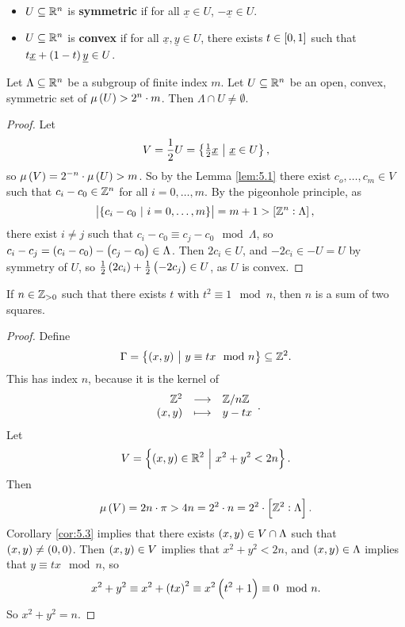 \pagebreak

\begin{definition}
\hfill
\begin{itemize}
\item $ U \subseteq \mathbb{R}^n $ is \textbf{symmetric} if for all $ \underline{x} \in U $, $ -\underline{x} \in U $.
\item $ U \subseteq \mathbb{R}^n $ is \textbf{convex} if for all $ \underline{x}, \underline{y} \in U $, there exists $ t \in \sbr{0, 1} $ such that $ t\underline{x} + \br{1 - t}\underline{y} \in U $.
\end{itemize}
\end{definition}

\begin{corollary}
\label{cor:5.3}
Let $ \Lambda \subseteq \mathbb{R}^n $ be a subgroup of finite index $ m $. Let $ U \subseteq \mathbb{R}^n $ be an open, convex, symmetric set of $ \mu\br{U} > 2^n \cdot m $. Then $ \Lambda \cap U \ne \emptyset $.
\end{corollary}

\begin{proof}
Let
$$ V = \dfrac{1}{2}U = \cbr{\tfrac{1}{2}\underline{x} \st \underline{x} \in U}, $$
so $ \mu\br{V} = 2^{-n} \cdot \mu\br{U} > m $. So by the Lemma \ref{lem:5.1} there exist $ c_o, \dots, c_m \in V $ such that $ c_i - c_0 \in \mathbb{Z}^n $ for all $ i = 0, \dots, m $. By the pigeonhole principle, as
$$ \abs{\cbr{c_i - c_0 \st i = 0, \dots, m}} = m + 1 > \sbr{\ZZ^n : \Lambda}, $$
there exist $ i \ne j $ such that $ c_i - c_0 \equiv c_j - c_0 \mod \Lambda $, so $ c_i - c_j = \br{c_i - c_0} - \br{c_j - c_0} \in \Lambda $. Then $ 2c_i \in U $, and $ -2c_i \in -U = U $ by symmetry of $ U $, so $ \tfrac{1}{2}\br{2c_i} + \tfrac{1}{2}\br{-2c_j} \in U $, as $ U $ is convex.
\end{proof}

\begin{theorem}
If $ n \in \mathbb{Z}_{> 0} $ such that there exists $ t $ with $ t^2 \equiv 1 \mod n $, then $ n $ is a sum of two squares.
\end{theorem}

\begin{proof}
Define
$$ \Gamma = \cbr{\br{x, y} \st y \equiv tx \mod n} \subseteq \ZZ^2. $$
This has index $ n $, because it is the kernel of
$$ \function{\ZZ^2}{\ZZ / n\ZZ}{\br{x, y}}{y - tx}. $$
Let
$$ V = \cbr{\br{x, y} \in \RR^2 \st x^2 + y^2 < 2n}. $$
Then
$$ \mu\br{V} = 2n \cdot \pi > 4n = 2^2 \cdot n = 2^2 \cdot \sbr{\ZZ^2 : \Lambda}. $$
Corollary \ref{cor:5.3} implies that there exists $ \br{x, y} \in V \cap \Lambda $ such that $ \br{x, y} \ne \br{0, 0} $. Then $ \br{x, y} \in V $ implies that $ x^2 + y^2 < 2n $, and $ \br{x, y} \in \Lambda $ implies that $ y \equiv tx \mod n $, so
$$ x^2 + y^2 \equiv x^2 + \br{tx}^2 \equiv x^2\br{t^2 + 1} \equiv 0 \mod n. $$
So $ x^2 + y^2 = n $.
\end{proof}

